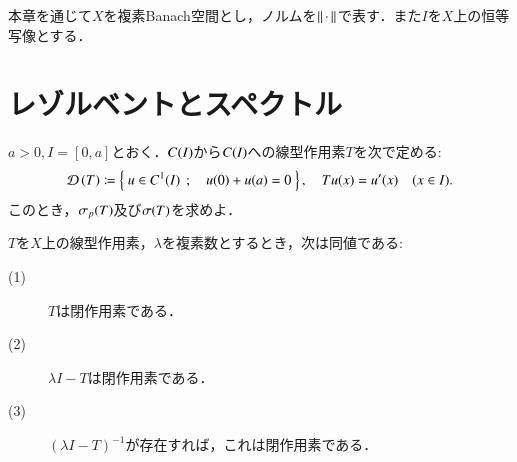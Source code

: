 本章を通じて$X$を複素Banach空間とし，ノルムを$\left\|\, \cdot\, \right\|_{}$で表す．また$I$を$X$上の恒等写像とする．

\section{レゾルベントとスペクトル}
	
	\begin{screen}
		\begin{e.g.}
			$a > 0,I = [0,a]$とおく．$C(I)$から$C(I)$への線型作用素$T$を次で定める:
			\begin{align}
				\Dom{T} \coloneqq \Set{u \in \cn{I}{1}}{u(0) + u(a) = 0},
				\quad Tu(x) = u'(x) \quad (x \in I).
			\end{align}
			このとき，$\mathfrak{\sigma}_p (T) $及び$\mathfrak{\sigma} (T) $を求めよ．
		\end{e.g.}
	\end{screen}
	
	
	
	\begin{screen}
		\begin{lem}[レゾルベントは閉作用素]
			$T$を$X$上の線型作用素，$\lambda$を複素数とするとき，次は同値である:
			\begin{description}
				\item[(1)] $T$は閉作用素である．
				\item[(2)] $\lambda I - T$は閉作用素である．
				\item[(3)] $(\lambda I - T)^{-1}$が存在すれば，これは閉作用素である．
			\end{description}
			\label{lem:resolvent_is_closed}
		\end{lem}
	\end{screen}
	
